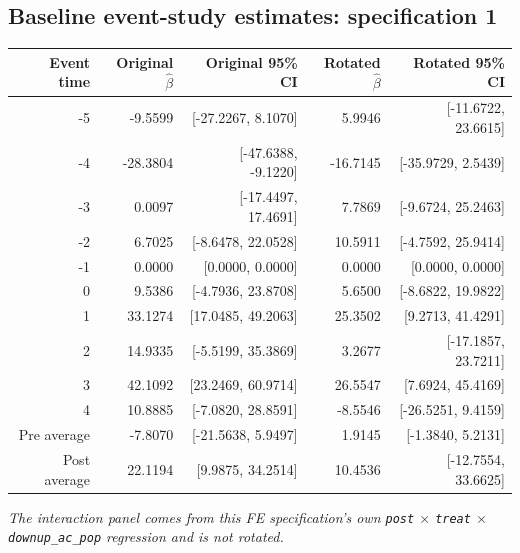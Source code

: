 \documentclass[10pt]{article}
\begin{document}
\subsection*{Baseline event-study estimates: specification 1}
\begin{center}
\scriptsize
\begin{tabular}{r rr rr}
\toprule
Event time & Original $\hat\beta$ & Original 95\% CI & Rotated $\hat\beta$ & Rotated 95\% CI \\
\midrule
-5 & -9.5599 & [-27.2267, 8.1070] & 5.9946 & [-11.6722, 23.6615] \\
-4 & -28.3804 & [-47.6388, -9.1220] & -16.7145 & [-35.9729, 2.5439] \\
-3 & 0.0097 & [-17.4497, 17.4691] & 7.7869 & [-9.6724, 25.2463] \\
-2 & 6.7025 & [-8.6478, 22.0528] & 10.5911 & [-4.7592, 25.9414] \\
-1 & 0.0000 & [0.0000, 0.0000] & 0.0000 & [0.0000, 0.0000] \\
0 & 9.5386 & [-4.7936, 23.8708] & 5.6500 & [-8.6822, 19.9822] \\
1 & 33.1274 & [17.0485, 49.2063] & 25.3502 & [9.2713, 41.4291] \\
2 & 14.9335 & [-5.5199, 35.3869] & 3.2677 & [-17.1857, 23.7211] \\
3 & 42.1092 & [23.2469, 60.9714] & 26.5547 & [7.6924, 45.4169] \\
4 & 10.8885 & [-7.0820, 28.8591] & -8.5546 & [-26.5251, 9.4159] \\
\midrule
Pre average & -7.8070 & [-21.5638, 5.9497] & 1.9145 & [-1.3840, 5.2131] \\
Post average & 22.1194 & [9.9875, 34.2514] & 10.4536 & [-12.7554, 33.6625] \\
\bottomrule
\end{tabular}
\end{center}
\medskip
\textit{The interaction panel comes from this FE specification's own \texttt{post} $\times$ \texttt{treat} $\times$ \texttt{downup\_ac\_pop} regression and is not rotated.}
\clearpage
\end{document}

